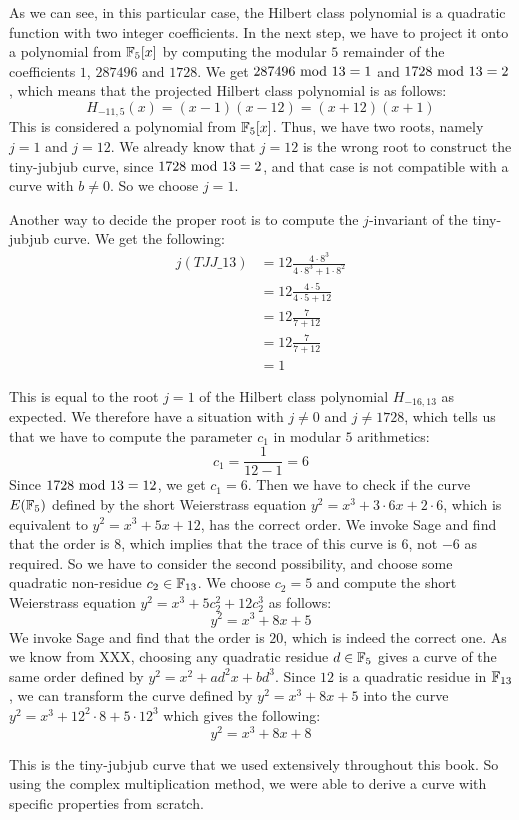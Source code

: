 \begin{example}
As we can see, in this particular case, the Hilbert class polynomial is a quadratic function with two integer coefficients. In the next step, we have to project it onto a polynomial from $\mathbb{F}_5[x]$ by computing the modular $5$ remainder of the coefficients $1$, $287496$ and $1728$. We get $287496 \text{ mod } 13=1$ and $1728 \text{ mod } 13=2$, which means that the projected Hilbert class polynomial is as follows:
$$
H_{-11,5}(x)=(x-1)(x-12)= (x+12)(x+1)
$$ 
This is considered a polynomial from $\mathbb{F}_5[x]$. Thus, we have two roots, namely $j=1$ and $j=12$. We already know that $j=12$ is the wrong root to construct the tiny-jubjub curve, since $1728 \text{ mod } 13=2$, and that case is not compatible with a curve with $b\neq 0$. So we choose $j=1$.

Another way to decide the proper root is to compute the $j$-invariant of the tiny-jubjub curve. We get the following:
\begin{align*}
j(\mathit{TJJ\_13}) & = 12\frac{4\cdot 8^3}{4\cdot 8^3+ 1\cdot 8^2}\\
                    & = 12\frac{4\cdot 5}{4\cdot 5+ 12}\\
                    & = 12\frac{7}{7+ 12}\\
                    & = 12\frac{7}{7+ 12}\\
                    & = 1
\end{align*}

This is equal to the root $j=1$ of the Hilbert class polynomial $H_{-16,13}$ as expected. We therefore have a situation with $j\neq 0$ and $j\neq 1728$, which tells us that we have to compute the parameter $c_1$ in modular $5$ arithmetics:
$$
c_1=\frac{1}{12-1} = 6
$$
Since $1728 \text{ mod } 13=12$, we get $c_1=6$. Then we have to check if the curve $E(\mathbb{F}_5)$ defined by the short Weierstrass  equation $y^2 = x^3 + 3\cdot 6 x + 2\cdot 6$, which is equivalent to
$
y^2 = x^3 + 5x +12
$, has the correct order. We invoke Sage and find that the order is $8$, which implies that the trace of this curve is $6$, not $-6$ as required. So we have to consider the second possibility, and choose some quadratic non-residue $c_2\in\mathbb{F}_{13}$. We choose $c_2=5$ and compute the short Weierstrass equation $y^2 = x^3 + 5 c_2^2 + 12 c_2^3$ as follows:
$$
y^2 = x^3 + 8 x + 5
$$
We invoke Sage and find that the order is $20$, which is indeed the correct one. As we know from XXX, choosing any quadratic residue $d\in \mathbb{F}_5$ gives a curve of the same order defined by $y^2 = x^2 + a d^2 x + bd^3$. Since $12$ is a quadratic residue in $\mathbb{F}_{13}$, we can transform the curve defined by 
$y^2 = x^3 +8x+5$ into the curve $y^2 = x^3 + 12^2\cdot 8 + 5\cdot 12^3$ which gives the following:
$$
y^2 = x^3 + 8x +8
$$

This is the tiny-jubjub curve that we used extensively throughout this book. So using the complex multiplication method, we were able to derive a curve with specific properties from scratch.
\end{example}

